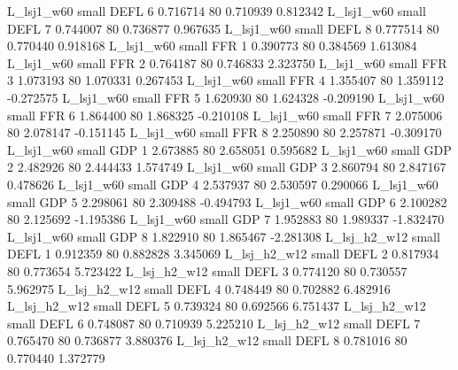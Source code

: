     L_lsj1_w60      small     DEFL                 6 0.716714 80       0.710939           0.812342
    L_lsj1_w60      small     DEFL                 7 0.744007 80       0.736877           0.967635
    L_lsj1_w60      small     DEFL                 8 0.777514 80       0.770440           0.918168
    L_lsj1_w60      small      FFR                 1 0.390773 80       0.384569           1.613084
    L_lsj1_w60      small      FFR                 2 0.764187 80       0.746833           2.323750
    L_lsj1_w60      small      FFR                 3 1.073193 80       1.070331           0.267453
    L_lsj1_w60      small      FFR                 4 1.355407 80       1.359112          -0.272575
    L_lsj1_w60      small      FFR                 5 1.620930 80       1.624328          -0.209190
    L_lsj1_w60      small      FFR                 6 1.864400 80       1.868325          -0.210108
    L_lsj1_w60      small      FFR                 7 2.075006 80       2.078147          -0.151145
    L_lsj1_w60      small      FFR                 8 2.250890 80       2.257871          -0.309170
    L_lsj1_w60      small      GDP                 1 2.673885 80       2.658051           0.595682
    L_lsj1_w60      small      GDP                 2 2.482926 80       2.444433           1.574749
    L_lsj1_w60      small      GDP                 3 2.860794 80       2.847167           0.478626
    L_lsj1_w60      small      GDP                 4 2.537937 80       2.530597           0.290066
    L_lsj1_w60      small      GDP                 5 2.298061 80       2.309488          -0.494793
    L_lsj1_w60      small      GDP                 6 2.100282 80       2.125692          -1.195386
    L_lsj1_w60      small      GDP                 7 1.952883 80       1.989337          -1.832470
    L_lsj1_w60      small      GDP                 8 1.822910 80       1.865467          -2.281308
  L_lsj_h2_w12      small     DEFL                 1 0.912359 80       0.882828           3.345069
  L_lsj_h2_w12      small     DEFL                 2 0.817934 80       0.773654           5.723422
  L_lsj_h2_w12      small     DEFL                 3 0.774120 80       0.730557           5.962975
  L_lsj_h2_w12      small     DEFL                 4 0.748449 80       0.702882           6.482916
  L_lsj_h2_w12      small     DEFL                 5 0.739324 80       0.692566           6.751437
  L_lsj_h2_w12      small     DEFL                 6 0.748087 80       0.710939           5.225210
  L_lsj_h2_w12      small     DEFL                 7 0.765470 80       0.736877           3.880376
  L_lsj_h2_w12      small     DEFL                 8 0.781016 80       0.770440           1.372779
